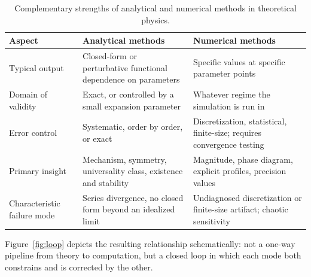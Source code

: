 \documentclass[11pt]{article}
\begin{document}
\begin{table}[h]
\centering
\small
\begin{tabular}{@{}p{2.6cm}p{5.4cm}p{5.4cm}@{}}
\toprule
\textbf{Aspect} & \textbf{Analytical methods} & \textbf{Numerical methods} \\
\midrule
Typical output & Closed-form or perturbative functional dependence on parameters & Specific values at specific parameter points \\
Domain of validity & Exact, or controlled by a small expansion parameter & Whatever regime the simulation is run in \\
Error control & Systematic, order by order, or exact & Discretization, statistical, finite-size; requires convergence testing \\
Primary insight & Mechanism, symmetry, universality class, existence and stability & Magnitude, phase diagram, explicit profiles, precision values \\
Characteristic failure mode & Series divergence, no closed form beyond an idealized limit & Undiagnosed discretization or finite-size artifact; chaotic sensitivity \\
\bottomrule
\end{tabular}
\caption{Complementary strengths of analytical and numerical methods in theoretical physics.}
\label{tab:comparison}
\end{table}

Figure~\ref{fig:loop} depicts the resulting relationship schematically: not a one-way pipeline from theory to computation, but a closed loop in which each mode both constrains and is corrected by the other.
\end{document}
